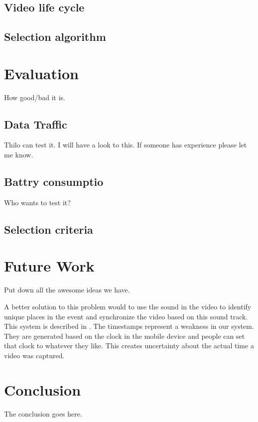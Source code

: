 \documentclass[conference]{IEEEtran}
\begin{document}
\subsection{Video life cycle}

\subsection{Selection algorithm}

\section{Evaluation}
How good/bad it is.

\subsection{Data Traffic} 
Thilo can test it. I will have a look to this. If someone has experience please let me know.

\subsection{Battry consumptio}
Who wants to test it?

\subsection{Selection criteria}

\section{Future Work}
Put down all the awesome ideas we have.

A better solution to this problem would to use the sound in the video to identify unique places in the event and synchronize the video based on this sound track. This system is described in \cite{shrestha_automatic_2010}. 
The timestamps represent a weakness in our system. They are generated based on the clock in the mobile device and people can set that clock to whatever they like. This creates uncertainty about the actual time a video was captured.


\section{Conclusion}
The conclusion goes here.


\end{document}
